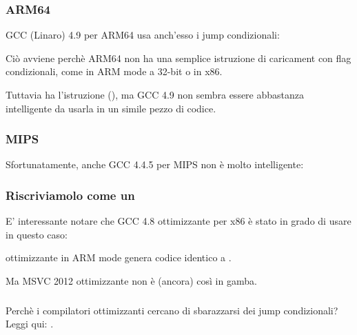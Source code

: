 

\subsubsection{ARM64}

\Optimizing GCC (Linaro) 4.9 per ARM64 usa anch'esso i jump condizionali:



Ciò avviene perchè ARM64 non ha una semplice istruzione di caricament con flag condizionali, come  in ARM mode a 32-bit o  in x86.

Tuttavia ha l'istruzione  (),
ma GCC 4.9 non sembra essere abbastanza intelligente da usarla in un simile pezzo di codice.

\subsubsection{MIPS}

Sfortunatamente, anche GCC 4.4.5 per MIPS non è molto intelligente:



\subsubsection{Riscriviamolo come un }




E' interessante notare che GCC 4.8 ottimizzante per x86 è stato in grado di usare  in questo caso:



\Keil ottimizzante in ARM mode genera codice identico a .

Ma MSVC 2012 ottimizzante non è (ancora) così in gamba.

\subsubsection{\Conclusione{}}

Perchè i compilatori ottimizzanti cercano di sbarazzarsi dei jump condizionali? Leggi qui: .

